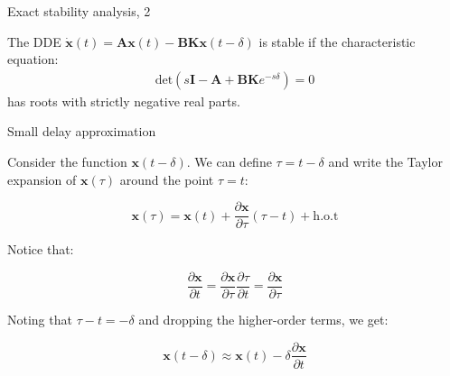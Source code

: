 \documentclass{beamer}
\begin{document}
\begin{frame}{Exact stability analysis, 2}
	\begin{flushleft}
		
		The DDE $\dot{\mathbf{x}}(t) = \mathbf{A} \mathbf{x}(t) - \mathbf{B} \mathbf{K}  \mathbf{x}(t - \delta)$ is stable if the characteristic equation:		
		\begin{align}
			\text{det}\left(s\mathbf{I} - \mathbf{A} + \mathbf{B} \mathbf{K} e^{-s \delta} \right) = 0
		\end{align}
		has roots with strictly negative real parts.
		
		
	\end{flushleft}
\end{frame}




\begin{frame}{Small delay approximation}
	\begin{flushleft}
		
		Consider the function $\mathbf{x}(t - \delta)$. We can define $\tau = t - \delta$ and write the Taylor expansion of $\mathbf{x}(\tau)$ around the point $\tau = t$:
		
		\begin{equation}
			\mathbf{x}(\tau) = \mathbf{x}(t) + \frac{\partial \mathbf{x}}{\partial \tau} (\tau - t) + \text{h.o.t}
		\end{equation}
		
		Notice that:
		
		\begin{equation}
			\frac{\partial \mathbf{x}}{\partial t} = 
			\frac{\partial \mathbf{x}}{\partial \tau} \frac{\partial \tau}{\partial t} = 
			\frac{\partial \mathbf{x}}{\partial \tau} 
		\end{equation}
		
		
		Noting that $\tau - t = -\delta$ and dropping the higher-order terms, we get:
		
		\begin{equation}
			\mathbf{x}(t - \delta) \approx \mathbf{x}(t) -\delta \frac{\partial \mathbf{x}}{\partial t}
		\end{equation}
		
		
	\end{flushleft}
\end{frame}
\end{document}
